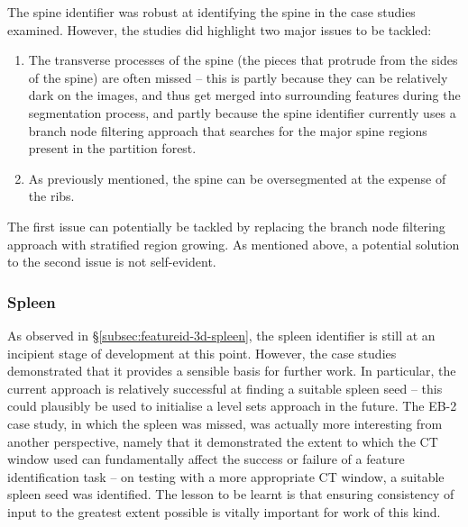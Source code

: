 The spine identifier was robust at identifying the spine in the case studies examined. However, the studies did highlight two major issues to be tackled:
%
\begin{enumerate}

\item The transverse processes of the spine (the pieces that protrude from the sides of the spine) are often missed -- this is partly because they can be relatively dark on the images, and thus get merged into surrounding features during the segmentation process, and partly because the spine identifier currently uses a branch node filtering approach that searches for the major spine regions present in the partition forest.

\item As previously mentioned, the spine can be oversegmented at the expense of the ribs.

\end{enumerate}
%
The first issue can potentially be tackled by replacing the branch node filtering approach with stratified region growing. As mentioned above, a potential solution to the second issue is not self-evident.

\subsubsection{Spleen}

As observed in \S\ref{subsec:featureid-3d-spleen}, the spleen identifier is still at an incipient stage of development at this point. However, the case studies demonstrated that it provides a sensible basis for further work. In particular, the current approach is relatively successful at finding a suitable spleen seed -- this could plausibly be used to initialise a level sets approach in the future. The EB-2 case study, in which the spleen was missed, was actually more interesting from another perspective, namely that it demonstrated the extent to which the CT window used can fundamentally affect the success or failure of a feature identification task -- on testing with a more appropriate CT window, a suitable spleen seed was identified. The lesson to be learnt is that ensuring consistency of input to the greatest extent possible is vitally important for work of this kind.

